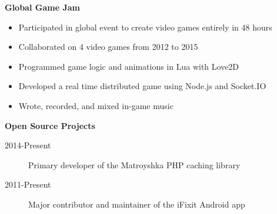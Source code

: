 \documentclass[letterpaper,11pt]{article}
\newcommand{\resitem}[1]{\item #1 \vspace{-2pt}}
\newcommand{\resheading}[1]{{\large \colorbox{mygrey}{\begin{minipage}{\textwidth}{\textbf{#1 \vphantom{p\^{E}}}}\end{minipage}}}}
\begin{document}
\resheading{Global Game Jam}

\begin{itemize}
   \resitem{Participated in global event to create video games entirely in 48 hours}
   \resitem{Collaborated on 4 video games from 2012 to 2015}
   \resitem{Programmed game logic and animations in Lua with Love2D}
   \resitem{Developed a real time distributed game using Node.js and Socket.IO}
   \resitem{Wrote, recorded, and mixed in-game music}
\end{itemize}

\resheading{Open Source Projects}

\begin{description}
\item[2014-Present] Primary developer of the Matroyshka PHP caching library
\item[2011-Present] Major contributor and maintainer of the iFixit Android app
\end{description}
\end{document}
